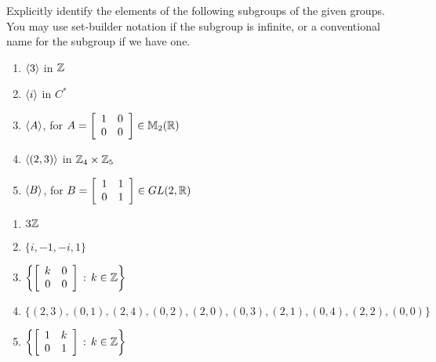 \begin{exercise}
Explicitly identify the elements of the following subgroups of the given groups. You may use set-builder notation if the subgroup is infinite, or a conventional name for the subgroup if we have one.

\begin{enumerate}
\item $\langle3\rangle$ in $\mathbb{Z}$
\item $\langle i\rangle$ in $C^*$
\item $\langle A\rangle$, for $A=\left[ \begin{array}{cc}
                          1 & 0 \\
                          0 & 0 \\
                        \end{array}
                      \right]\in \mathbb{M}_2(\mathbb{R})$
\item $\langle(2,3)\rangle$ in $\mathbb{Z}_4\times \mathbb{Z}_5$
\item $\langle B\rangle$, for $B=\left[ \begin{array}{cc}
                          1 & 1\\
                          0 & 1 \\
                        \end{array}
                      \right]\in GL(2,\mathbb{R})$
\end{enumerate}

\end{exercise}


\begin{solution}[print=false]

\begin{enumerate}
\item $3\mathbb{Z}$
\item $\{i,-1,-i,1\}$
\item $\left\{\left[
                \begin{array}{cc}
                  k & 0 \\
                  0 & 0 \\
                \end{array}
              \right]\,:\,k\in \mathbb{Z}
\right\}$
\item $\{(2,3),(0,1),(2,4),(0,2),(2,0),(0,3),(2,1),(0,4),(2,2),(0,0)\}$
\item $\left\{\left[
                \begin{array}{cc}
                  1 & k \\
                  0 & 1 \\
                \end{array}
              \right]\,:\,k\in \mathbb{Z}\right\}$
\end{enumerate}

\end{solution}

